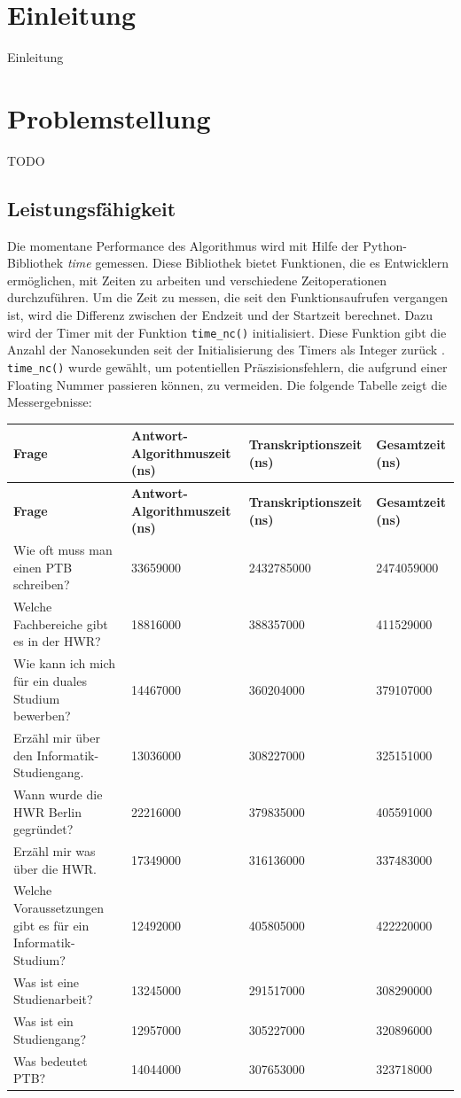 \section{Einleitung}
Einleitung

\section{Problemstellung}
TODO
\subsection{Leistungsfähigkeit}
Die momentane Performance des Algorithmus wird mit Hilfe der Python-Bibliothek \textit{time} gemessen. Diese Bibliothek bietet Funktionen, die es Entwicklern ermöglichen, mit Zeiten zu arbeiten und verschiedene Zeitoperationen durchzuführen. Um die Zeit zu messen, die seit den Funktionsaufrufen vergangen ist, wird die Differenz zwischen der Endzeit und der Startzeit berechnet. Dazu wird der Timer mit der Funktion \lstinline|time_nc()| initialisiert. Diese Funktion gibt die Anzahl der Nanosekunden seit der Initialisierung des Timers als Integer zurück \cite{pythonTimer}. \lstinline|time_nc()| wurde gewählt, um  potentiellen Präszisionsfehlern, die aufgrund einer Floating Nummer passieren können, zu vermeiden. Die folgende Tabelle zeigt die Messergebnisse: 

\begin{longtable}{|p{5cm}|p{3cm}|p{3.5cm}|p{3cm}|}
\hline
\textbf{Frage} & \textbf{Antwort-Algorithmuszeit (ns)} & \textbf{Transkriptionszeit (ns)} & \textbf{Gesamtzeit (ns)} \\
\hline
\endfirsthead

\hline
\textbf{Frage} & \textbf{Antwort-Algorithmuszeit (ns)} & \textbf{Transkriptionszeit (ns)} & \textbf{Gesamtzeit (ns)} \\
\hline
\endhead

\hline
\endfoot

Wie oft muss man einen PTB schreiben? & 33659000 & 2432785000 & 2474059000 \\
\hline
Welche Fachbereiche gibt es in der HWR? & 18816000 & 388357000 & 411529000 \\
\hline
Wie kann ich mich für ein duales Studium bewerben? & 14467000 & 360204000 & 379107000 \\
\hline
Erzähl mir über den Informatik-Studiengang. & 13036000 & 308227000 & 325151000 \\
\hline
Wann wurde die HWR Berlin gegründet? & 22216000 & 379835000 & 405591000 \\
\hline
Erzähl mir was über die HWR. & 17349000 & 316136000 & 337483000 \\
\hline
Welche Voraussetzungen gibt es für ein Informatik-Studium? & 12492000 & 405805000 & 422220000 \\
\hline
Was ist eine Studienarbeit? & 13245000 & 291517000 & 308290000 \\
\hline
Was ist ein Studiengang? & 12957000 & 305227000 & 320896000 \\
\hline
Was bedeutet PTB? & 14044000 & 307653000 & 323718000 \\
\hline

\end{longtable}

